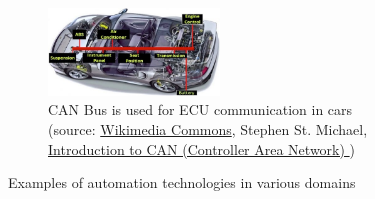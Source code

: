 \begin{frame}
\begin{figure}
		\hfill
		\begin{subfigure}[b]{0.49\textwidth}
			\centering
			\includegraphics[width=0.5\textwidth]{fig/lec01/CAN.jpg}
			\caption{CAN Bus is used for ECU 
communication in cars (source: \href{https://www.allaboutcircuits.com/uploads/articles/CAN.jpg}{Wikimedia Commons}, Stephen St. Michael, \href{https://www.allaboutcircuits.com/technical-articles/introduction-to-can-controller-area-network/}{ Introduction to CAN (Controller Area Network) })}
		\end{subfigure}
		\vspace{-0.5cm}
		\caption*{Examples of automation technologies in various domains} 
        \label{fig:examples_machine_drives_02}
	\end{figure}
\end{frame}


